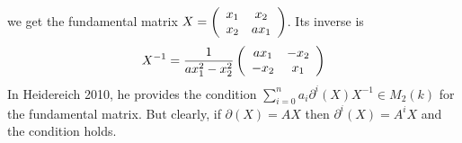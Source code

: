  we get the fundamental matrix $X = \left(\bao{cc}
x_1 & x_2\\
x_2 & a x_1\\
\ea\right)$. Its inverse is
$$X^{-1} = \frac{1}{a x_1^2 - x_2^2} \left(
\bao{cc}
a x_1 & -x_2\\
-x_2 & x_1\\
\ea\right)$$
In Heidereich 2010, he provides the condition $\sum_{i=0}^n a_i \partial^i(X) X^{-1} \in M_2(k)$ for the fundamental matrix. But clearly, if $\partial(X) = A X$ then $\partial^i(X) = A^i X$ and the condition holds.%
